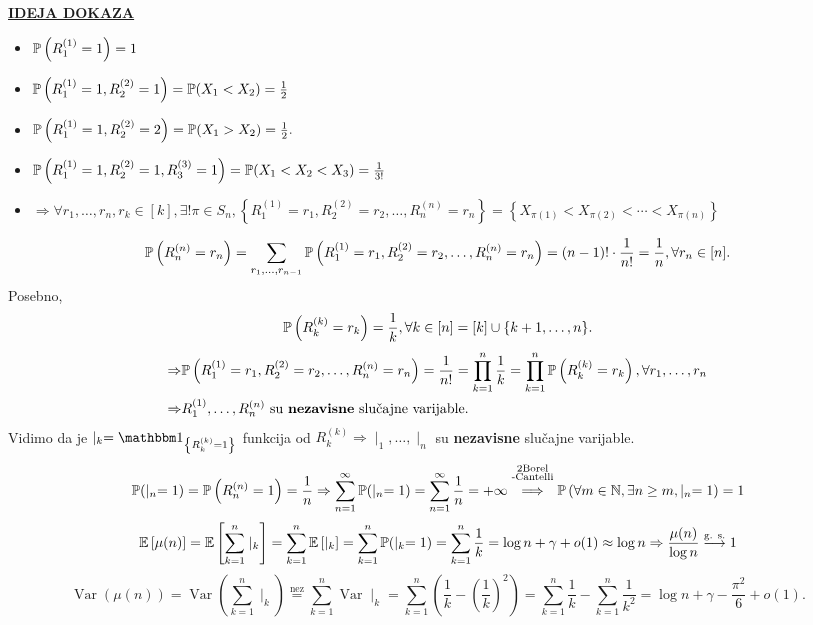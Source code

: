 \documentclass{article}
\newcommand{\Var}{\operatorname{Var}}
\begin{document}
\underline{\textbf{IDEJA DOKAZA}}
\begin{itemize}
    \item[\ding{228}]\(\Bbb P\left(R_1^{(1)}=1\right)=1\)
    \item[\ding{228}]\(\Bbb P\left(R_1^{(1)}=1, R_2^{(2)}=1\right)=\Bbb P(X_1<X_2)=\frac12\)
    \item[\ding{228}]\(\Bbb P\left(R_1^{(1)}=1,R_2^{(2)}=2\right)=\Bbb P(X_1>X_2)=\frac12.\)
    \item[\ding{228}]\(\Bbb P\left(R_1^{(1)}=1,R_2^{(2)}=1,R_3^{(3)}=1\right)=\Bbb P(X_1<X_2<X_3)=\frac1{3!}\)
    \item[\ding{228}]\(\Rightarrow \forall r_1,\ldots,r_n,r_k\in[k],\exists!\pi\in S_n,\left\{R_1^{(1)}=r_1,R_2^{(2)}=r_2,\ldots,R_n^{(n)}=r_n\right\}=\left\{X_{\pi(1)}< X_{\pi(2)}<\cdots<X_{\pi(n)}\right\}\)
\end{itemize}
\[\Bbb P\left(R_n^{(n)}=r_n\right)=\sum_{r_1,\ldots,r_{n-1}}\Bbb P\left(R_1^{(1)}=r_1,R_2^{(2)}=r_2,\ldots,R_n^{(n)}=r_n\right)=(n-1)!\cdot\frac1{n!}=\frac1n,\forall r_n\in[n].\] Posebno, \[\Bbb P\left(R_k^{(k)}=r_k\right)=\frac1k,\forall k\in[n]=[k]\cup\{k+1,\ldots,n\}.\]  \[\begin{aligned}\Rightarrow&\Bbb P\left(R_1^{(1)}=r_1,R_2^{(2)}=r_2,\ldots, R_n^{(n)}=r_n\right)=\frac1{n!}=\prod_{k=1}^n\frac1k=\prod_{k=1}^n\Bbb P\left(R_k^{(k)}=r_k\right),\forall r_1,\ldots,r_n\\\Rightarrow& R_1^{(1)},\ldots,R_n^{(n)}\text{ su \textbf{nezavisne} slučajne varijable}.\end{aligned}\] Vidimo da je \(\mid_k=\mathbbm 1_{\left\{R_k^{(k)}=1\right\}}\) funkcija od \(R_k^{(k)}\Rightarrow \mid_1,\ldots,\mid_n\) su \textbf{nezavisne} slučajne varijable. \[\Bbb P(\mid_n=1)=\Bbb P\left(R_n^{(n)}=1\right)=\frac1n\Rightarrow\sum_{n=1}^\infty\Bbb P(\mid_n=1)=\sum_{n=1}^\infty\frac1n=+\infty\overset{\substack{2\text{Borel}\\\text{-Cantelli}\\\text{}}}{\Longrightarrow}\Bbb P\left(\forall m\in\Bbb N,\exists n\ge m,\mid_n=1\right)=1\] \[\Bbb E\left[\mu(n)\right]=\Bbb E\left[\sum_{k=1}^n\mid_k\right]=\sum_{k=1}^n\Bbb E\left[\mid_k\right]=\sum_{k=1}^n\Bbb P(\mid_k=1)=\sum_{k=1}^n\frac1k=\log n+\gamma+o(1)\approx\log n\Rightarrow\frac{\mu(n)}{\log n}\overset{\text{g. s.}}{\longrightarrow}1\] \[\Var (\mu(n))=\Var \left(\sum_{k=1}^n\mid_k\right)\overset{\text{nez}}{=}\sum_{k=1}^n\Var \mid_k=\sum_{k=1}^n\left(\frac1k-\left(\frac1k\right)^2\right)=\sum_{k=1}^n\frac1k-\sum_{k=1}^n\frac1{k^2}=\log n+\gamma-\frac{\pi^2}6+o(1).\]
\end{document}
